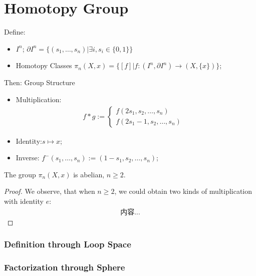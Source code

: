 \documentclass[Total.tex]{subfiles}
\begin{document}
		\section{Homotopy Group}
			\begin{Def}
				Define:
				\begin{itemize}
					\item $I^n$; $\partial I^n=\{(s_1,\dots,s_n)|\exists i,s_i\in \{0,1\}\}$
					\item Homotopy Classes $\pi_n(X,x)=\{[f]|f:(I^n,\partial I^n)\rightarrow (X,\{x\})\}$;
				\end{itemize}
				
				Then: Group Structure
				\begin{itemize}
					\item Multiplication:
					\begin{gather*}
						f*g:=\begin{cases}
							f(2s_1,s_2,\dots,s_n)&\\
							f(2s_1-1,s_2,\dots,s_n)
						\end{cases}
					\end{gather*}
					\item Identity:$s\mapsto x$;
					\item Inverse: $f^-(s_1,\dots,s_n):=(1-s_1,s_2,\dots,s_n)$;
				\end{itemize}
			\end{Def}
			
			\begin{proposition}
				The group $\pi_n(X,x)$ is abelian, $n\geq 2$. 
			\end{proposition}
			\begin{proof}
				We observe, that when $n\geq 2$, we could obtain two kinds of multiplication with identity $e$:
				\begin{gather*}
					内容...
				\end{gather*}
			\end{proof}
			\subsubsection{Definition through Loop Space}
			\subsubsection{Factorization through Sphere}
			
\end{document}
